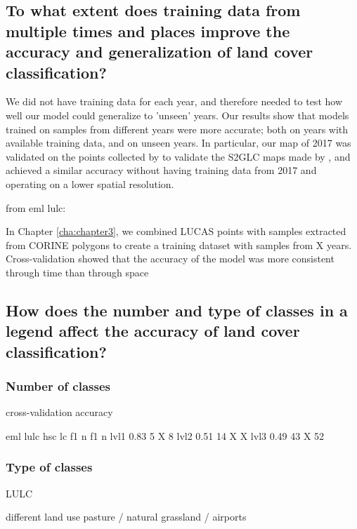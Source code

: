     
    
    \subsection{To what extent does training data from multiple times and places improve the accuracy and generalization of land cover classification?}
    
    We did not have training data for each year, and therefore needed to test how well our model could generalize to 'unseen' years. Our results show that models trained on samples from different years were more accurate; both on years with available training data, and on unseen years. In particular, our map of 2017 was validated on the points collected by \citep{jenerowicz2021validation} to validate the S2GLC maps made by \citet{malinowski2020automated}, and achieved a similar accuracy without having training data from 2017 and operating on a lower spatial resolution.
    
    from eml lulc:
    
    In Chapter \ref{cha:chapter3}, we combined LUCAS points with samples extracted from CORINE polygons to create a training dataset with samples from X years. Cross-validation showed that the accuracy of the model was more consistent through time than through space
    
    \subsection{How does the number and type of classes in a legend affect the accuracy of land cover classification?}
    
    \subsubsection{Number of classes}
    cross-validation accuracy
    
            eml lulc        hsc lc
            f1      n       f1  n
    lvl1    0.83    5       X   8
    lvl2    0.51    14      X   X
    lvl3    0.49    43      X   52
    
    
    
    \subsubsection{Type of classes}
    
    LULC
    
    different land use
    pasture / natural grassland / airports
    
